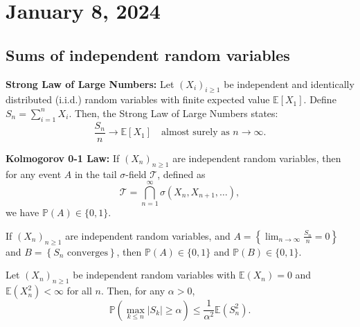 \section{January 8, 2024}
\subsection{Sums of  independent random variables}
\textbf{Strong Law of Large Numbers:}
Let $(X_i)_{i \geq 1}$ be independent and identically distributed (i.i.d.) random variables with finite expected value $\mathbb{E}[X_1]$. Define $S_n = \sum_{i=1}^n X_i$. Then, the Strong Law of Large Numbers states:
\[
\frac{S_n}{n} \to \mathbb{E}[X_1] \quad \text{almost surely as } n \to \infty.
\]

\textbf{Kolmogorov 0-1 Law:}
If $(X_n)_{n \geq 1}$ are independent random variables, then for any event $A$ in the tail $\sigma$-field $\mathcal{T}$, defined as
\[
\mathcal{T} = \bigcap_{n=1}^\infty \sigma(X_n, X_{n+1}, \dots),
\]
we have $\mathbb{P}(A) \in \{0,1\}$.

\begin{corollary}
If $(X_n)_{n \geq 1}$ are independent random variables, and $A = \left\{ \lim_{n \to \infty} \frac{S_n}{n} = 0 \right\}$ and $B = \left\{ S_n \text{ converges} \right\}$, then $\mathbb{P}(A) \in \{0,1\}$ and $\mathbb{P}(B) \in \{0,1\}$.
\end{corollary}

\begin{theorem}
Let $(X_n)_{n \geq 1}$ be independent random variables with $\mathbb{E}(X_n) = 0$ and $\mathbb{E}(X_n^2) < \infty$ for all $n$. Then, for any $\alpha > 0$,
\[
\mathbb{P}\left( \max_{k \leq n} |S_k| \geq \alpha \right) \leq \frac{1}{\alpha^2} \mathbb{E}(S_n^2).
\]
\end{theorem}

